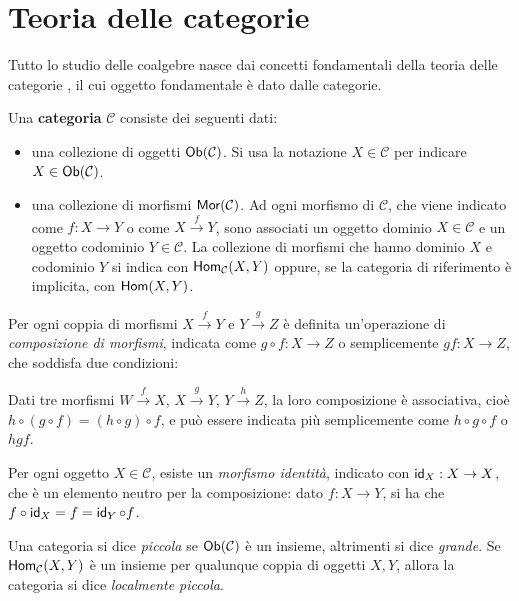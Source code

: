 \chapter{Teoria delle categorie}
Tutto lo studio delle coalgebre nasce dai concetti fondamentali della teoria delle categorie \cite{jacobs2017}, il cui oggetto fondamentale è dato dalle categorie.

\begin{definition}[Categoria]
  Una \textbf{categoria} \(\mathcal{C}\) consiste dei seguenti dati:
  \begin{itemize}
    \item una collezione di oggetti \(\operatorname{\operatorname{\mathsf{Ob}}}(\mathcal{C})\). Si usa la notazione \(X\in\mathcal{C}\) per indicare \(X\in\operatorname{\operatorname{\mathsf{Ob}}}(\mathcal{C})\).

    \item una collezione di morfismi \(\operatorname{\operatorname{\mathsf{Mor}}}(\mathcal{C})\). Ad ogni morfismo di \(\mathcal{C}\), che viene indicato come \(f:X\to Y\) o come \(X \xrightarrow{f} Y\), sono associati un oggetto dominio \(X\in\mathcal{C}\) e un oggetto codominio \(Y\in\mathcal{C}\). La collezione di morfismi che hanno dominio \(X\) e codominio \(Y\) si indica con \(\operatorname{\operatorname{\mathsf{Hom}}}_{\mathcal{C}}(X, Y)\) oppure, se la categoria di riferimento è implicita, con \(\operatorname{\operatorname{\mathsf{Hom}}}(X, Y)\).
  \end{itemize}

  Per ogni coppia di morfismi \(X \xrightarrow{f} Y\) e \(Y \xrightarrow{g} Z\) è definita un'operazione di \textit{composizione di morfismi}, indicata come \(g \circ f : X \to Z\) o semplicemente \(gf : X \to Z\), che soddisfa due condizioni:
  \begin{description}[font=\normalfont]
    \item[1. Associatività:] Dati tre morfismi \(W \xrightarrow{f} X\), \(X \xrightarrow{g} Y\), \(Y \xrightarrow{h} Z\), la loro composizione è associativa, cioè \(h \circ \left( g \circ f\right) = \left( h \circ g\right) \circ f\), e può essere indicata più semplicemente come \(h \circ g \circ f\) o \(hgf\).
    \item[2. Morfismo identità:] Per ogni oggetto \(X \in \mathcal{C}\), esiste un \textit{morfismo identità}, indicato con \(\operatorname{\operatorname{\mathsf{id}}}_X : X \to X\), che è un elemento neutro per la composizione: dato \(f : X \to Y\), si ha che \(f \circ \operatorname{\operatorname{\mathsf{id}}}_X = f = \operatorname{\operatorname{\mathsf{id}}}_Y \circ f\).
  \end{description}

  Una categoria si dice \textit{piccola} se \(\operatorname{\operatorname{\mathsf{Ob}}}(\mathcal{C})\) è un insieme, altrimenti si dice \textit{grande}. Se \(\operatorname{\operatorname{\mathsf{Hom}}}_{\mathcal{C}}(X, Y)\) è un insieme per qualunque coppia di oggetti \(X, Y\), allora la categoria si dice \textit{localmente piccola}.
\end{definition}

